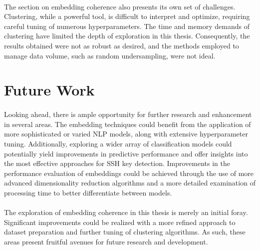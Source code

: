 \paragraph{}The section on embedding coherence also presents its own set of challenges. Clustering, while a powerful tool, is difficult to interpret and optimize, requiring careful tuning of numerous hyperparameters. The time and memory demands of clustering have limited the depth of exploration in this thesis. Consequently, the results obtained were not as robust as desired, and the methods employed to manage data volume, such as random undersampling, were not ideal.

\section{Future Work}

\paragraph{}Looking ahead, there is ample opportunity for further research and enhancement in several areas. The embedding techniques could benefit from the application of more sophisticated or varied NLP models, along with extensive hyperparameter tuning. Additionally, exploring a wider array of classification models could potentially yield improvements in predictive performance and offer insights into the most effective approaches for SSH key detection. Improvements in the performance evaluation of embeddings could be achieved through the use of more advanced dimensionality reduction algorithms and a more detailed examination of processing time to better differentiate between models.

\paragraph{}The exploration of embedding coherence in this thesis is merely an initial foray. Significant improvements could be realized with a more refined approach to dataset preparation and further tuning of clustering algorithms. As such, these areas present fruitful avenues for future research and development.
